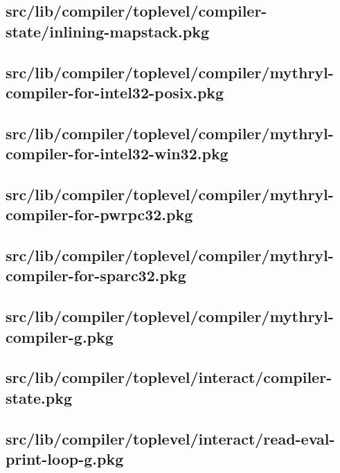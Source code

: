 \subsection{src/lib/compiler/toplevel/compiler-state/inlining-mapstack.pkg}


\subsection{src/lib/compiler/toplevel/compiler/mythryl-compiler-for-intel32-posix.pkg}


\subsection{src/lib/compiler/toplevel/compiler/mythryl-compiler-for-intel32-win32.pkg}


\subsection{src/lib/compiler/toplevel/compiler/mythryl-compiler-for-pwrpc32.pkg}


\subsection{src/lib/compiler/toplevel/compiler/mythryl-compiler-for-sparc32.pkg}


\subsection{src/lib/compiler/toplevel/compiler/mythryl-compiler-g.pkg}


\subsection{src/lib/compiler/toplevel/interact/compiler-state.pkg}


\subsection{src/lib/compiler/toplevel/interact/read-eval-print-loop-g.pkg}


